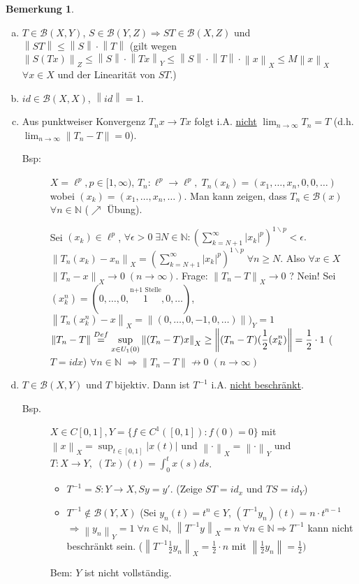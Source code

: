 \documentclass[ngerman]{report}
\theoremstyle{plain}%
\theoremstyle{definition}%
\theoremstyle{myStyle}
\newtheorem{bem}[thm]{Bemerkung}
\newcommand{\N}{\mathbb{N}}
\newcommand{\B}{\mathcal{B}} %
\newcommand{\BS}[1][X,Y]{\mathcal{B}(#1)} %
\newcommand{\norm}[1]{\left \|#1\right\| }
\newcommand{\df}[1][]{%
	\overset{#1}{\Rightarrow}
}
\newcommand{\U}[2][1]{U_{#1}(#2)} %
\newcommand{\EK}{\U{0}} %
\newcommand{\limes}[1][\infty]{\lim_{n \to #1}}
\newcommand{\inv}[1]{#1^{-1}}
\newcommand{\supT}[1][a]{
	\IfEqCase{#1}{
	{A}{\sup_{x \in \overline{\EK}}} 
	{R}{\sup_{x \in \partial\EK}}
	{a}{\sup_{x \in \EK}}
	}
} %
\newcommand{\disp}{\displaystyle}
\begin{document}
	\begin{bem}
		\begin{enumerate}[a)]
			\item $T\in \BS$, $S \in \B(Y,Z) \df ST \in \B(X,Z)$ und 
				$\norm{ST} \leq \norm{S} \cdot \norm{T}$ 
				(gilt wegen $\norm{S(Tx)}_Z \leq \norm{S} \cdot \norm{Tx}_Y
				\leq \norm{S} \cdot \norm{T} \cdot \norm{x}_X \leq M \norm{x}_X$ $\forall x\in X$ und der Linearität von $ST$.) 
			\item $id\in \B(X,X)$, $\norm{id} = 1$.
			\item Aus punktweiser Konvergenz $T_nx \to Tx$ folgt
			i.A. \underline{nicht} $\disp \limes T_n = T$ (d.h. $\limes \norm{T_n - T} = 0$).
				\begin{description} \item[Bsp:] 
					$X = \ell^p, p\in [1,\infty)$, $T_n:\ell^p \to \ell^p, \; T_n(x_k) = (x_1,\dots,x_n,0,0,\dots)$ 
					wobei $(x_k) = (x_1,\dots,x_n,\dots).$ Man kann zeigen, dass $T_n \in \B(x)$ $\forall n\in\N$ 
					($\nearrow$ Übung).\par
					Sei $(x_k)\in \ell^p$, $\forall \epsilon > 0 \; \exists N\in\N: (\sum_{k=N+1}^\infty |x_k|^p)^{1\backslash p} < \epsilon.$\ $\norm{T_n(x_k) - x_n}_X = (\sum_{k=N+1}^\infty |x_k|^p)^{1\backslash p} \; \forall n\geq N$.
					Also $\forall x \in X$ $\norm{T_n - x}_X \to 0 \; (n\to \infty).$ Frage: $\norm{T_n - T}_X \to 0$ ?
					Nein! Sei $(x_k^n) = (0,\dots,0,\overset{\text{n+1 Stelle}}{1},0,\dots)$,  
					$\norm{T_n(x_k^n) - x}_X = \norm{(0,\dots,0,-1,0,\dots)})_Y = 1$ 
					$\disp \norm{T_n - T} \overset{Def}{=} \supT \norm{(T_n - T)x}_X \geq 
					\norm{(T_n - T)(\frac{1}{2} (x_k^n)} =\frac{1}{2}\cdot 1$ ($T = idx$) $\forall n\in\N$ 
					$\df \norm{T_n - T} \not\to 0\; (n\to\infty)$
				\end{description}

		\item $T\in \BS$ und $T$ bijektiv. Dann ist $\inv{T}$ i.A. \underline{nicht beschränkt}.
			\begin{description} 
				\item[Bsp.]	$X\in C[0,1], Y= \{f\in C^1([0,1]): f(0) = 0\}$ mit $\disp \norm{x}_X = \sup_{t\in[0,1]}|x(t)|$ und $\norm{\cdot}_X = \norm{\cdot}_Y$ und $T: X\to Y,\; (Tx)(t) = \int_0^t x(s)ds$.
				\begin{itemize}
					\item $\inv{T}=S: Y\to X, Sy = y'$. (Zeige $ST = id_x$ und $TS = id_Y$)
					\item $\inv{T}\not\in\B(Y,X)$ (Sei $y_n(t) = t^n\in Y$, $(\inv{T}y_n)(t) = n\cdot t^{n-1}$
					$\df \norm{y_n}_Y =1 \; \forall n\in \N$, $\norm{\inv{T}y}_X =n \; \forall n\in\N \df \inv{T}$ kann nicht beschränkt sein. 
					($\norm{\inv{T}\frac{1}{2} y_n}_X = \frac{1}{2} \cdot n$ mit $\norm{\frac{1}{2} y_n} = \frac{1}{2})$
				\end{itemize}
				Bem: $Y$ ist nicht vollständig.
			\end{description}
		\end{enumerate}
	\end{bem}
\end{document}
